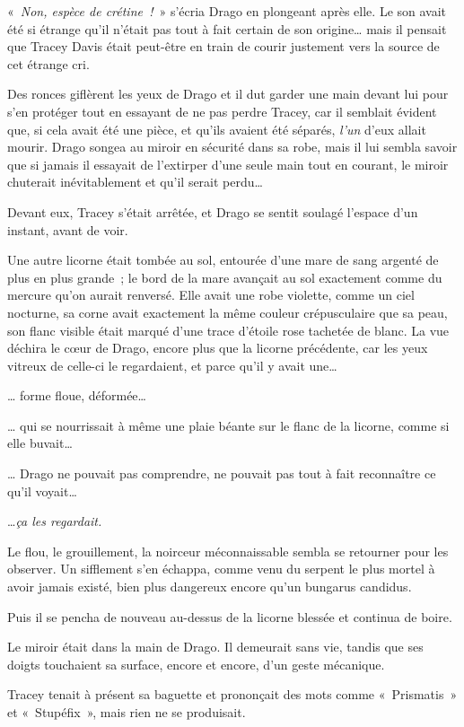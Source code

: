 «~\emph{Non, espèce de crétine~!}~» s'écria Drago en plongeant après elle.
Le son avait été si étrange qu'il n'était pas tout à fait certain de son origine… mais il pensait que Tracey Davis était peut-être en train de courir justement vers la source de cet étrange cri.

Des ronces giflèrent les yeux de Drago et il dut garder une main devant lui pour s'en protéger tout en essayant de ne pas perdre Tracey, car il semblait évident que, si cela avait été une pièce, et qu'ils avaient été séparés, \emph{l'un} d'eux allait mourir.
Drago songea au miroir en sécurité dans sa robe, mais il lui sembla savoir que si jamais il essayait de l'extirper d'une seule main tout en courant, le miroir chuterait inévitablement et qu'il serait perdu…

Devant eux, Tracey s'était arrêtée, et Drago se sentit soulagé l'espace d'un instant, avant de voir.

Une autre licorne était tombée au sol, entourée d'une mare de sang argenté de plus en plus grande~; le bord de la mare avançait au sol exactement comme du mercure qu'on aurait renversé.
Elle avait une robe violette, comme un ciel nocturne, sa corne avait exactement la même couleur crépusculaire que sa peau, son flanc visible était marqué d'une trace d'étoile rose tachetée de blanc.
La vue déchira le cœur de Drago, encore plus que la licorne précédente, car les yeux vitreux de celle-ci le regardaient, et parce qu'il y avait une…

… forme floue, déformée…

… qui se nourrissait à même une plaie béante sur le flanc de la licorne, comme si elle buvait…

… Drago ne pouvait pas comprendre, ne pouvait pas tout à fait reconnaître ce qu'il voyait…

…\emph{ça les regardait.}

Le flou, le grouillement, la noirceur méconnaissable sembla se retourner pour les observer.
Un sifflement s'en échappa, comme venu du serpent le plus mortel à avoir jamais existé, bien plus dangereux encore qu'un bungarus candidus.

Puis il se pencha de nouveau au-dessus de la licorne blessée et continua de boire.

Le miroir était dans la main de Drago.
Il demeurait sans vie, tandis que ses doigts touchaient sa surface, encore et encore, d'un geste mécanique.

Tracey tenait à présent sa baguette et prononçait des mots comme «~Prismatis~» et «~Stupéfix~», mais rien ne se produisait.

